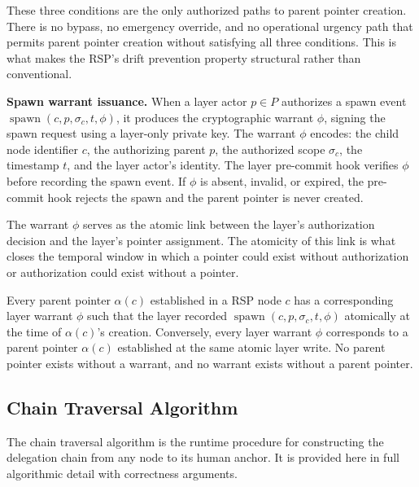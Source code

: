 These three conditions are the only authorized paths to parent pointer creation. There is no bypass, no emergency override, and no operational urgency path that permits parent pointer creation without satisfying all three conditions. This is what makes the RSP's drift prevention property structural rather than conventional.

\medskip
\noindent\textbf{Spawn warrant issuance.} When a \purpose{} layer actor $p \in P$ authorizes a spawn event $\operatorname{spawn}(c, p, \sigma_c, t, \phi)$, it produces the cryptographic warrant $\phi$, signing the spawn request using a \purpose{} layer-only private key. The warrant $\phi$ encodes: the child node identifier $c$, the authorizing parent $p$, the authorized scope $\sigma_c$, the timestamp $t$, and the \purpose{} layer actor's identity. The \fact{} layer pre-commit hook verifies $\phi$ before recording the spawn event. If $\phi$ is absent, invalid, or expired, the pre-commit hook rejects the spawn and the parent pointer is never created.

The warrant $\phi$ serves as the atomic link between the \purpose{} layer's authorization decision and the \fact{} layer's pointer assignment. The atomicity of this link is what closes the temporal window in which a pointer could exist without authorization or authorization could exist without a pointer.

\begin{prop}
\label{prop:spawn-auth-completeness}
Every parent pointer $\alpha(c)$ established in a RSP node $c$ has a corresponding \purpose{} layer warrant $\phi$ such that the \fact{} layer recorded $\operatorname{spawn}(c, p, \sigma_c, t, \phi)$ atomically at the time of $\alpha(c)$'s creation. Conversely, every \purpose{} layer warrant $\phi$ corresponds to a parent pointer $\alpha(c)$ established at the same atomic \fact{} layer write. No parent pointer exists without a warrant, and no warrant exists without a parent pointer.
\end{prop}

\subsection{Chain Traversal Algorithm}
\label{sec:chain-traversal-algorithm}

The chain traversal algorithm is the runtime procedure for constructing the delegation chain from any node to its human anchor. It is provided here in full algorithmic detail with correctness arguments.


